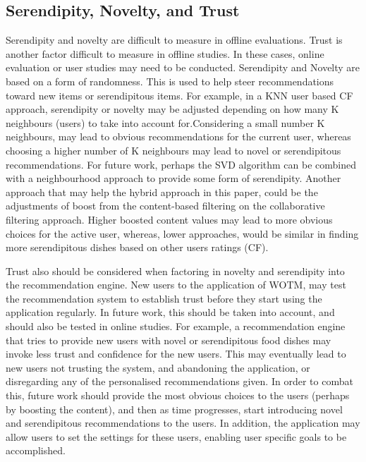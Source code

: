 \subsection{Serendipity, Novelty, and Trust}
Serendipity and novelty are difficult to measure in offline evaluations. Trust is another factor difficult to measure in offline studies. In these cases, online evaluation or user studies may need to be conducted. Serendipity and Novelty are based on a form of randomness. This is used to help steer recommendations toward new items or serendipitous items. For example, in a KNN user based CF approach, serendipity or novelty may be adjusted depending on how many K neighbours (users) to take into account for.Considering a small number K neighbours, may lead to obvious recommendations for the current user, whereas choosing a higher number of K neighbours may lead to novel or serendipitous recommendations. For future work, perhaps the SVD algorithm can be combined with a neighbourhood approach to provide some form of serendipity. Another approach that may help the hybrid approach in this paper, could be the adjustments of boost from the content-based filtering on the collaborative filtering approach. Higher boosted content values may lead to more obvious choices for the active user, whereas, lower approaches, would be similar in finding more serendipitous dishes based on other users ratings (CF).  

Trust also should be considered when factoring in novelty and serendipity into the recommendation engine. New users to the application of WOTM, may test the recommendation system to establish trust before they start using the application regularly. In future work, this should be taken into account, and should also be tested in online studies. For example, a recommendation engine that tries to provide new users with novel or serendipitous food dishes may invoke less trust and confidence for the new users. This may eventually lead to new users not trusting the system, and abandoning the application, or disregarding any of the personalised recommendations given. In order to combat this, future work should provide the most obvious choices to the users (perhaps by boosting the content), and then as time progresses, start introducing novel and serendipitous recommendations to the users. In addition, the application may allow users to set the settings for these users, enabling user specific goals to be accomplished. 

